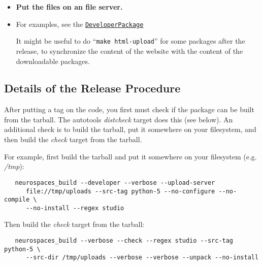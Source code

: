 \documentclass[12pt]{article}
\begin{document}
\begin{itemize}
\item {\bf Put the files on an file server.}

\item For examples, see the \href{../developer-package/developer-package.tex}{\tt DeveloperPackage} 

  It might be useful to do ``{\tt make html-upload}'' for some packages after the release, to synchronize the content of the website with the content of the downloadable packages. 
\end{itemize}


\subsection*{Details of the Release Procedure}

After putting a tag on the code, you first must check if the package
can be built from the tarball. The autotools {\it distcheck} target
does this (see below). An additional check is to build the tarball,
put it somewhere on your filesystem, and then build the {\it check}
target from the tarball.

For example, first build the tarball and put it somewhere on your filesystem (e.g. {\it /tmp}):
\begin{verbatim}
   neurospaces_build --developer --verbose --upload-server 
      file://tmp/uploads --src-tag python-5 --no-configure --no-compile \
      --no-install --regex studio
\end{verbatim}
Then build the {\it check} target from the tarball:
\begin{verbatim}
   neurospaces_build --verbose --check --regex studio --src-tag python-5 \
      --src-dir /tmp/uploads --verbose --verbose --unpack --no-install
\end{verbatim}
\end{document}

